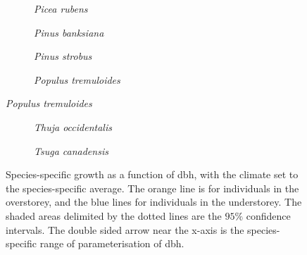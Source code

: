 \documentclass[letterpaper, 12pt]{article}
\theoremstyle{theo}
\begin{document}
\begin{refsection}
\begin{onehalfspace}
\begin{figure}[htb] \ContinuedFloat %
	\centering
	\begin{subfigure}{0.48\textwidth}
		
		\caption{\textit{Picea rubens}}
		\label{fig::picrub_G_dbh}
	\end{subfigure}
	\hfil
	\begin{subfigure}{0.48\textwidth}
		
		\caption{\textit{Pinus banksiana}}
		\label{fig::pinban_G_dbh}
	\end{subfigure}
	\medskip
	\begin{subfigure}{0.48\textwidth}
		
		\caption{\textit{Pinus strobus}}
		\label{fig::pinstr_G_dbh}
	\end{subfigure}
	\hfil
	\begin{subfigure}{0.48\textwidth}
		
		\caption{\textit{Populus tremuloides}}
		\label{fig::poptre_G_dbh}
	\end{subfigure}
\end{figure}

\begin{figure}[htb] \ContinuedFloat %
	\centering
	\begin{subfigure}{0.48\textwidth}
		
		\caption{\textit{Thuja occidentalis}}
		\label{fig::thuocc_G_dbh}
	\end{subfigure}
	\hfil
	\begin{subfigure}{0.48\textwidth}
		
		\caption{\textit{Tsuga canadensis}}
		\label{fig::tsucan_G_dbh}
	\end{subfigure}
	\caption{Species-specific growth as a function of dbh, with the climate set to the species-specific average. The orange line is for individuals in the overstorey, and the blue lines for individuals in the understorey. The shaded areas delimited by the dotted lines are the $ 95 \% $ confidence intervals. The double sided arrow near the x-axis is the species-specific range of parameterisation of dbh.}
	\label{fig::12speciesG_dbh}
\end{figure}


\end{onehalfspace}
\end{refsection}
\end{document}
